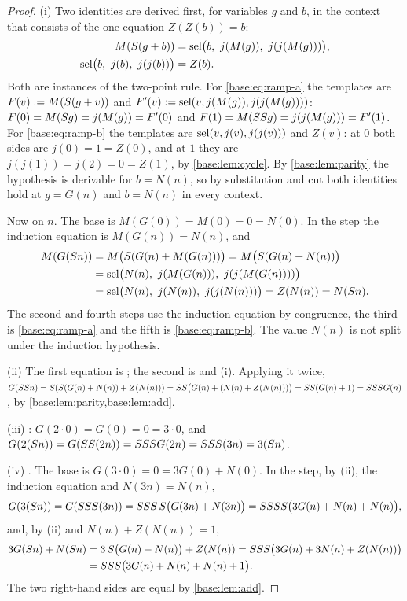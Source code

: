 \begin{proof}
(i) Two identities are derived first, for variables $g$ and $b$, in the
context that consists of the one equation $Z(Z(b))=b$:
\begin{align}
 M(S(g+b))&=\operatorname{sel}\bigl(b,\ j(M(g)),\ j(j(M(g)))\bigr),
   \label{base:eq:ramp-a}\\
 \operatorname{sel}\bigl(b,\ j(b),\ j(j(b))\bigr)&=Z(b). \label{base:eq:ramp-b}
\end{align}
Both are instances of the two-point rule.  For \eqref{base:eq:ramp-a} the
templates are $F(v)\mathrel{:=} M(S(g+v))$ and
$F'(v)\mathrel{:=}\operatorname{sel}(v,j(M(g)),j(j(M(g))))$:
$F(0)=M(S g)=j(M(g))=F'(0)$ and
$F(1)=M(SS g)=j(j(M(g)))=F'(1)$.  For \eqref{base:eq:ramp-b} the
templates are $\operatorname{sel}(v,j(v),j(j(v)))$ and $Z(v)$: at $0$ both sides are
$j(0)=1=Z(0)$, and at $1$ they are $j(j(1))=j(2)=0=Z(1)$, by
\cref{base:lem:cycle}.  By \cref{base:lem:parity} the hypothesis is
derivable for $b=N(n)$, so by substitution and cut both identities hold at
$g=G(n)$ and $b=N(n)$ in every context.

Now  on $n$.  The base is $M(G(0))=M(0)=0=N(0)$.  In the step
the induction equation is $M(G(n))=N(n)$, and
\begin{align*}
 M(G(S n))
 &=M\bigl(S(G(n)+M(G(n)))\bigr)
  =M\bigl(S(G(n)+N(n))\bigr)\\
 &=\operatorname{sel}\bigl(N(n),\ j(M(G(n))),\ j(j(M(G(n))))\bigr)\\
 &=\operatorname{sel}\bigl(N(n),\ j(N(n)),\ j(j(N(n)))\bigr)
  =Z(N(n))=N(S n).
\end{align*}
The second and fourth steps use the induction equation by congruence, the
third is \eqref{base:eq:ramp-a} and the fifth is \eqref{base:eq:ramp-b}.
The value $N(n)$ is not split under the induction hypothesis.

(ii) The first equation is ; the second is  and
(i).  Applying it twice,
$G(SS n)=S(S(G(n)+N(n))+Z(N(n)))
 =SS\bigl(G(n)+(N(n)+Z(N(n)))\bigr)=SS(G(n)+1)
 =SSS G(n)$, by \cref{base:lem:parity,base:lem:add}.

(iii) : $G(2\cdot 0)=G(0)=0=3\cdot 0$, and
$G(2(S n))=G(SS(2n))=SSS G(2n)=SSS(3n)
 =3(S n)$.

(iv) .  The base is $G(3\cdot 0)=0=3G(0)+N(0)$.  In the step,
by (ii), the induction equation and $N(3n)=N(n)$,
\[
 G(3(S n))=G(SSS(3n))=SSS\,S\bigl(G(3n)+N(3n)\bigr)
 =SSSS\bigl(3G(n)+N(n)+N(n)\bigr),
\]
and, by (ii) and $N(n)+Z(N(n))=1$,
\begin{align*}
 3G(S n)+N(S n)
 &=3\,S\bigl(G(n)+N(n)\bigr)+Z(N(n))
  =SSS\bigl(3G(n)+3N(n)+Z(N(n))\bigr)\\
 &=SSS\bigl(3G(n)+N(n)+N(n)+1\bigr).
\end{align*}
The two right-hand sides are equal by \cref{base:lem:add}.
\end{proof}

